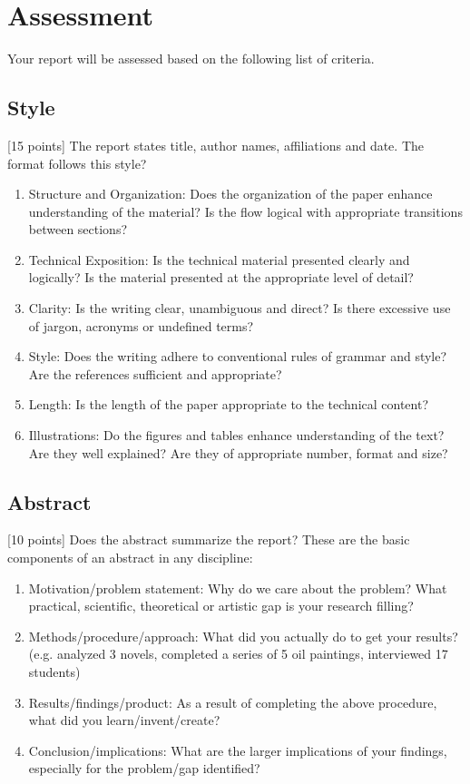 \documentclass{winslabreport}
\begin{document}
\section{Assessment}

Your report will be assessed based on the following list of criteria.


\subsection{Style}
[15 points] The report states  title, author names, affiliations and date. The format follows this style?

\begin{enumerate}
\item Structure and Organization: Does the organization of the paper enhance understanding of the material? Is the flow logical with appropriate transitions between sections?
\item Technical Exposition: Is the technical material presented clearly and logically? Is the material presented at the appropriate level of detail?
\item  Clarity: Is the writing clear, unambiguous and direct? Is there excessive use of jargon, acronyms or undefined terms?
\item Style: Does the writing adhere to conventional rules of grammar and style? Are the references sufficient and appropriate?
\item Length: Is the length of the paper appropriate to the technical content? 
\item Illustrations: Do the figures and tables enhance understanding of the text? Are they well explained? Are they of appropriate number, format and size?
\end{enumerate}


\subsection{Abstract}
[10 points] Does the abstract summarize the report? These are the basic components of an abstract in any discipline:

\begin{enumerate}
\item Motivation/problem statement: Why do we care about the problem? What practical, scientific, theoretical or artistic gap is your research filling?
\item  Methods/procedure/approach: What did you actually do to get your results? (e.g. analyzed 3 novels, completed a series of 5 oil paintings, interviewed 17 students)
\item Results/findings/product: As a result of completing the above procedure, what did you learn/invent/create?
\item Conclusion/implications: What are the larger implications of your findings, especially for the problem/gap identified? 
\end{enumerate}
\end{document}
